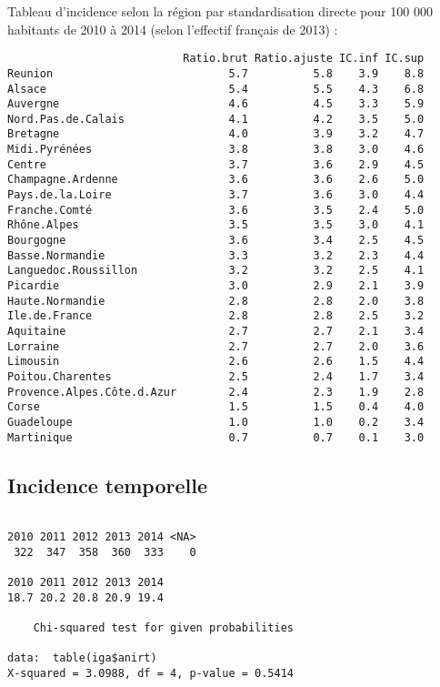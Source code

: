 \documentclass[11pt,a4paper]{article}\usepackage[]{graphicx}\usepackage[]{color}
\makeatletter
\newenvironment{kframe}{%
 \def\at@end@of@kframe{}%
 \ifinner\ifhmode%
  \def\at@end@of@kframe{\end{minipage}}%
  \begin{minipage}{\columnwidth}%
 \fi\fi%
 \def\FrameCommand##1{\hskip\@totalleftmargin \hskip-\fboxsep
 \colorbox{shadecolor}{##1}\hskip-\fboxsep
     \hskip-\linewidth \hskip-\@totalleftmargin \hskip\columnwidth}%
 \MakeFramed {\advance\hsize-\width
   \@totalleftmargin\z@ \linewidth\hsize
   \@setminipage}}%
 {\par\unskip\endMakeFramed%
 \at@end@of@kframe}
\newenvironment{knitrout}{}{} %
\makeatother
\begin{document}
Tableau d'incidence selon la région par standardisation directe pour 100 000 habitants de 2010 à 2014 (selon l'effectif français de 2013) :
\begin{knitrout}
\color{fgcolor}\begin{kframe}
\begin{verbatim}
                           Ratio.brut Ratio.ajuste IC.inf IC.sup
Reunion                           5.7          5.8    3.9    8.8
Alsace                            5.4          5.5    4.3    6.8
Auvergne                          4.6          4.5    3.3    5.9
Nord.Pas.de.Calais                4.1          4.2    3.5    5.0
Bretagne                          4.0          3.9    3.2    4.7
Midi.Pyrénées                     3.8          3.8    3.0    4.6
Centre                            3.7          3.6    2.9    4.5
Champagne.Ardenne                 3.6          3.6    2.6    5.0
Pays.de.la.Loire                  3.7          3.6    3.0    4.4
Franche.Comté                     3.6          3.5    2.4    5.0
Rhône.Alpes                       3.5          3.5    3.0    4.1
Bourgogne                         3.6          3.4    2.5    4.5
Basse.Normandie                   3.3          3.2    2.3    4.4
Languedoc.Roussillon              3.2          3.2    2.5    4.1
Picardie                          3.0          2.9    2.1    3.9
Haute.Normandie                   2.8          2.8    2.0    3.8
Ile.de.France                     2.8          2.8    2.5    3.2
Aquitaine                         2.7          2.7    2.1    3.4
Lorraine                          2.7          2.7    2.0    3.6
Limousin                          2.6          2.6    1.5    4.4
Poitou.Charentes                  2.5          2.4    1.7    3.4
Provence.Alpes.Côte.d.Azur        2.4          2.3    1.9    2.8
Corse                             1.5          1.5    0.4    4.0
Guadeloupe                        1.0          1.0    0.2    3.4
Martinique                        0.7          0.7    0.1    3.0
\end{verbatim}
\end{kframe}
\end{knitrout}

  \subsection{Incidence temporelle}

\begin{knitrout}
\color{fgcolor}\begin{kframe}
\begin{verbatim}

2010 2011 2012 2013 2014 <NA> 
 322  347  358  360  333    0 

2010 2011 2012 2013 2014 
18.7 20.2 20.8 20.9 19.4 

	Chi-squared test for given probabilities

data:  table(iga$anirt)
X-squared = 3.0988, df = 4, p-value = 0.5414
\end{verbatim}
\end{kframe}
\end{knitrout}
\end{document}
